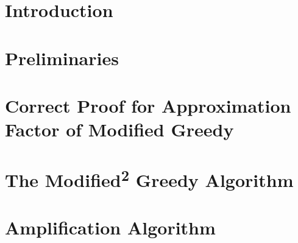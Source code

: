 \section{Introduction}

\section{Preliminaries}\label{sec:Preliminaries}

\section{Correct Proof for Approximation Factor of Modified Greedy}\label{sec:ModifiedGreedy}

\section{The Modified\textsuperscript{2} Greedy Algorithm}\label{sec:Modified2Greedy}


\section{Amplification Algorithm}\label{sec:Amplification}
